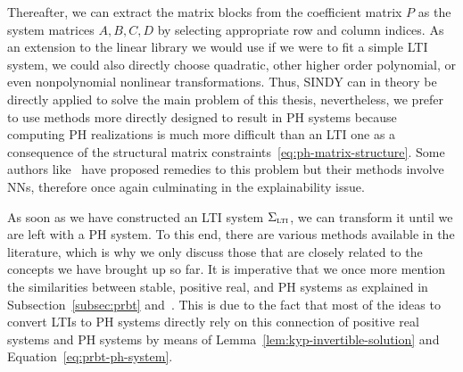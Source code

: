 Thereafter, we can extract the matrix blocks from the coefficient matrix $P$ as the system matrices $A, B, C, D$ by selecting appropriate row and column indices.
As an extension to the linear library we would use if we were to fit a simple \ac{LTI} system, we could also directly choose quadratic, other higher order polynomial, or even nonpolynomial nonlinear transformations.
Thus, \ac{SINDY} can in theory be directly applied to solve the main problem of this thesis, nevertheless, we prefer to use methods more directly designed to result in \ac{PH} systems because computing \ac{PH} realizations is much more difficult than an \ac{LTI} one as a consequence of the structural matrix constraints~\eqref{eq:ph-matrix-structure}.
Some authors like~\cite{Lee2022} have proposed remedies to this problem but their methods involve \acp{NN}, therefore once again culminating in the explainability issue.

As soon as we have constructed an \ac{LTI} system $\Sigma_{\textnormal{\scshape lti}}$, we can transform it until we are left with a \ac{PH} system.
To this end, there are various methods available in the literature, which is why we only discuss those that are closely related to the concepts we have brought up so far.
It is imperative that we once more mention the similarities between stable, positive real, and \ac{PH} systems as explained in Subsection~\ref{subsec:prbt} and~\cite{Cherifi2022}.
This is due to the fact that most of the ideas to convert \acp{LTI} to \ac{PH} systems directly rely on this connection of positive real systems and \ac{PH} systems by means of Lemma~\ref{lem:kyp-invertible-solution} and Equation~\eqref{eq:prbt-ph-system}.

